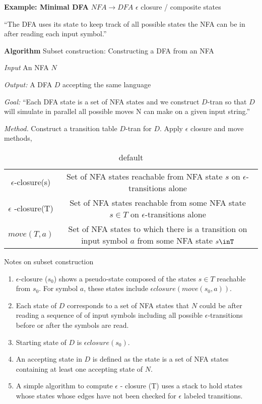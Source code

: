 \textbf{\Large Example: Minimal DFA}  $NFA\to DFA$ $\epsilon$ closure / composite states

``The DFA uses its state to keep track of all possible states the NFA can be in after reading each input symbol.''  

\textbf {Algorithm} Subset construction: Constructing a DFA from an NFA

\textsl{Input} An NFA $N$

\textsl{Output:} A DFA $D$ accepting the same language

\textsl{Goal:} ``Each DFA state is a set of NFA states and we construct $D$-tran so that $D$ will simulate in parallel all possible moves N can make on a given input string.''  

\textsl{Method.} Construct a transition table $D$-tran for $D$.  Apply $\epsilon$ closure and move methods, 
\begin{table}[htdp]
\caption{default}
\begin{center}
\begin{tabular}{|c|c|}
$\epsilon$-closure(s) & Set of NFA states reachable from NFA state $s$ on $\epsilon$-transitions alone \\
$\epsilon$ -closure(T) & Set of NFA states reachable from some NFA state $s\in T$ on $\epsilon$-transitions alone \\
$move(T,a)$ & Set of NFA states to which there is a transition on input symbol $a$ from some NFA state $s\inT$
\end{tabular}
\end{center}
\label{default}
\end{table}%

{\large Notes on subset construction}
\begin{enumerate}
\item $\epsilon$-closure ($s_0$) shows a pseudo-state composed of the states $s\in T$ reachable from $s_0$.  For symbol $a$, these states include $\epsilon closure(move(s_0,a))$.
\item
Each state of $D$ corresponds to a set of NFA states that $N$ could be after reading a sequence of of input symbols including all possible $\epsilon$-transitions before or after the symbols are read.  
\item 
Starting state of $D$ is $\epsilon closure (s_0)$.  
\item
An accepting state in $D$ is defined as the state  is a set of NFA states containing at least one accepting state of $N$.  
\item
A simple algorithm to compute $\epsilon$ - closure (T) uses a stack to hold states whose states whose edges have not been checked for $\epsilon$ labeled transitions.  
\end{enumerate}


